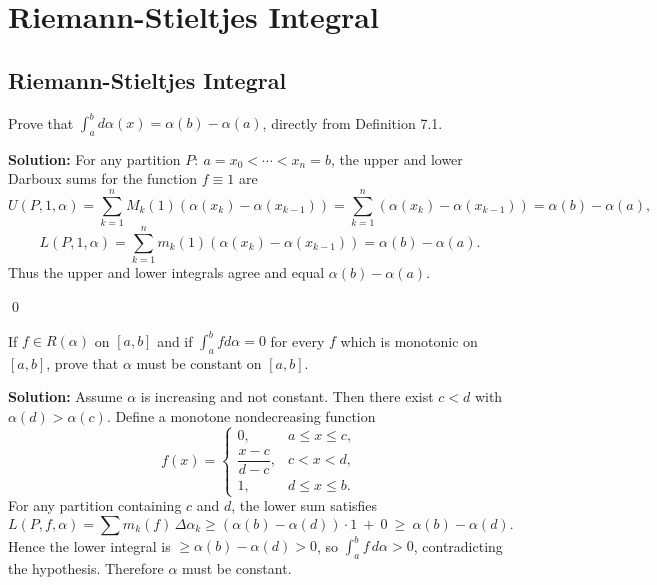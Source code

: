 \chapter{Riemann-Stieltjes Integral}

\section{Riemann-Stieltjes Integral}


\begin{problembox}
Prove that $\int_a^b d\alpha(x) = \alpha(b) - \alpha(a)$, directly from Definition 7.1.
\end{problembox}

\noindent\textbf{Solution:}
For any partition $P:\ a=x_0<\cdots<x_n=b$, the upper and lower Darboux sums for the function $f\equiv 1$ are
\[U(P,1,\alpha)=\sum_{k=1}^n M_k(1)(\alpha(x_k)-\alpha(x_{k-1}))=\sum_{k=1}^n (\alpha(x_k)-\alpha(x_{k-1}))=\alpha(b)-\alpha(a),\]
\[L(P,1,\alpha)=\sum_{k=1}^n m_k(1)(\alpha(x_k)-\alpha(x_{k-1}))=\alpha(b)-\alpha(a).\]
Thus the upper and lower integrals agree and equal $\alpha(b)-\alpha(a)$.




\qed
\begin{problembox}
If $f \in R(\alpha)$ on $[a, b]$ and if $\int_a^b f d\alpha = 0$ for every $f$ which is monotonic on $[a, b]$, prove that $\alpha$ must be constant on $[a, b]$.
\end{problembox}

\noindent\textbf{Solution:}
Assume $\alpha$ is increasing and not constant. Then there exist $c<d$ with $\alpha(d)>\alpha(c)$. Define a monotone nondecreasing function
\[
f(x)=\begin{cases}
0,& a\le x\le c,\\
\dfrac{x-c}{d-c},& c<x<d,\\
1,& d\le x\le b.
\end{cases}
\]
For any partition containing $c$ and $d$, the lower sum satisfies
\[L(P,f,\alpha)=\sum m_k(f)\,\Delta\alpha_k\ge (\alpha(b)-\alpha(d))\cdot 1\ +\ 0\ \ge\ \alpha(b)-\alpha(d).
\]
Hence the lower integral is $\ge \alpha(b)-\alpha(d)>0$, so $\int_a^b f\,d\alpha>0$, contradicting the hypothesis. Therefore $\alpha$ must be constant.





